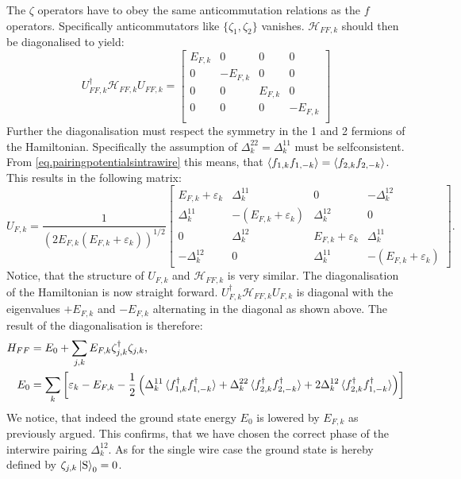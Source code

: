 The $\zeta$ operators have to obey the same anticommutation relations as the $f$ operators. Specifically anticommutators like $\{\zeta_1, \zeta_2 \} $ vanishes. $\mathcal{H}_{FF,k}$ should then be diagonalised to yield:
\begin{equation}
U^\dagger_{FF,k}\mathcal{H}_{FF,k}U_{FF,k} = \begin{bmatrix} 
E_{F,k} & 0        & 0       & 0        \\ 
0       & -E_{F,k} & 0       & 0        \\ 
0       & 0        & E_{F,k} & 0        \\ 
0       & 0        & 0       & -E_{F,k} \\ 
\end{bmatrix} \nonumber
\end{equation}
Further the diagonalisation must respect the symmetry in the 1 and 2 fermions of the Hamiltonian. Specifically the assumption of $\Delta^{22}_k = \Delta^{11}_k$ must be selfconsistent. From \ref{eq.pairingpotentialsintrawire} this means, that $\braket{f_{1,k}f_{1,-k}} = \braket{f_{2,k}f_{2,-k}}$. This results in the following matrix:
\begin{equation}
U_{F,k} = \frac{1}{(2E_{F,k}(E_{F,k}+\varepsilon_k))^{1/2}}\begin{bmatrix} 
E_{F,k}+\varepsilon_k & \Delta^{11}_k             & 0                      & -\Delta^{12}_k           \\  
\Delta^{11}_k         & -(E_{F,k}+\varepsilon_k)  & \Delta^{12}_k          & 0                        \\ 
0                     & \Delta^{12}_k             & E_{F,k}+\varepsilon_k  & \Delta^{11}_k           \\ 
-\Delta^{12}_k        & 0                         & \Delta^{11}_k          & -(E_{F,k}+\varepsilon_k)
\end{bmatrix}. \nonumber
\end{equation}
Notice, that the structure of $U_{F,k}$ and $\mathcal{H}_{FF,k}$ is very similar. The diagonalisation of the Hamiltonian is now straight forward. $U^\dagger_{F,k}\mathcal{H}_{FF,k}U_{F,k}$ is diagonal with the eigenvalues $+E_{F,k}$ and $-E_{F,k}$ alternating in the diagonal as shown above. The result of the diagonalisation is therefore:
\begin{align}
H_{FF} &= E_0 + \sum_{j,k} E_{F,k}\zeta^\dagger_{j, k}\zeta_{j, k}, \nonumber \\ 
E_0 &= \sum_k \left[\varepsilon_k - E_{F,k} - \frac{1}{2}\left(\Delta^{11}_k\braket{f^\dagger_{1,k}f^\dagger_{1,-k}} + \Delta^{22}_k\braket{f^\dagger_{2,k}f^\dagger_{2,-k}} + 2\Delta^{12}_k\braket{f^\dagger_{2,k}f^\dagger_{1,-k}} \right) \right] 
\end{align}  
We notice, that indeed the ground state energy $E_0$ is lowered by $E_{F,k}$ as previously argued. This confirms, that we have chosen the correct phase of the interwire pairing $\Delta^{12}_k$. As for the single wire case the ground state is hereby defined by $\zeta_{j,k}\ket{\text{S}}_0 = 0$. 


